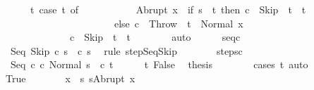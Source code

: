 \begin{isabellebody}
\ \ \ \ \ \ t{\isacharcolon}\ {\isachardoublequoteopen}{\isacharparenleft}case\ t\ of\isanewline
\ \ \ \ \ \ \ \ \ \ \ Abrupt\ x\ {\isasymRightarrow}\ if\ s{\isacharprime}\ {\isacharequal}\ t\ then\ c{\isacharprime}\ {\isacharequal}\ Skip\ {\isasymand}\ t{\isacharprime}\ {\isacharequal}\ t\ \isanewline
\ \ \ \ \ \ \ \ \ \ \ \ \ \ \ \ \ \ \ \ \ \ \ else\ c{\isacharprime}\ {\isacharequal}\ Throw\ {\isasymand}\ t{\isacharprime}\ {\isacharequal}\ Normal\ x\isanewline
\ \ \ \ \ \ \ \ \ \ \ {\isacharbar}\ {\isacharunderscore}\ {\isasymRightarrow}\ c{\isacharprime}\ {\isacharequal}\ Skip\ {\isasymand}\ t{\isacharprime}\ {\isacharequal}\ t{\isacharparenright}{\isachardoublequoteclose}\isanewline
\ \ \ \ \ \ \isamarkupfalse%
\ auto\isanewline
\ \ \ \ \isamarkupfalse%
\ seq{\isacharunderscore}c\ \isanewline
\ \ \ \ \isamarkupfalse%
\ \isamarkupfalse%
\ {\isachardoublequoteopen}{\isasymGamma}{\isasymturnstile}\ {\isacharparenleft}Seq\ Skip\ c\ s{\isacharprime}{\isacharparenright}\ {\isasymrightarrow}\ {\isacharparenleft}c\ s{\isacharprime}{\isacharparenright}{\isachardoublequoteclose}\ \isamarkupfalse%
\ {\isacharparenleft}rule\ step{\isachardot}SeqSkip{\isacharparenright}\isanewline
\ \ \ \ \isamarkupfalse%
\ \isamarkupfalse%
\ steps{\isacharunderscore}c\isanewline
\ \ \ \ \isamarkupfalse%
\ \isamarkupfalse%
\ {\isachardoublequoteopen}{\isasymGamma}{\isasymturnstile}\ {\isacharparenleft}Seq\ c\ c\ Normal\ s{\isacharparenright}\ {\isasymrightarrow}\isactrlsup {\isacharasterisk}\ {\isacharparenleft}c{\isacharprime}{\isacharcomma}\ t{\isacharprime}{\isacharparenright}{\isachardoublequoteclose}\isacommand{{\isachardot}}\isamarkupfalse%
\isanewline
\ \ \ \ \isamarkupfalse%
\ t\ False\ \isamarkupfalse%
\ {\isacharquery}thesis\isanewline
\ \ \ \ \ \ \isamarkupfalse%
\ {\isacharparenleft}cases\ t{\isacharparenright}\ auto\isanewline
\ \ \isamarkupfalse%
\isanewline
\ \ \ \ \isamarkupfalse%
\ True\isanewline
\ \ \ \ \isamarkupfalse%
\ \isamarkupfalse%
\ x\ \ s{\isacharprime}{\isacharcolon}\ {\isachardoublequoteopen}s{\isacharprime}{\isacharequal}Abrupt\ x{\isachardoublequoteclose}\isanewline

\end{isabellebody}
